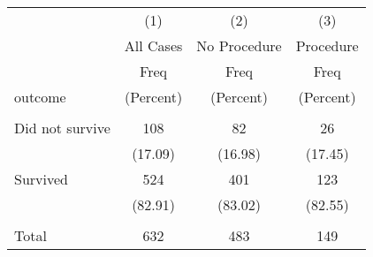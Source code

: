\begin{tabular}{lccc} \hline
 & (1) & (2) & (3) \\
 & All Cases & No Procedure & Procedure \\
 & Freq & Freq & Freq \\
outcome & (Percent) & (Percent) & (Percent) \\ \hline
 &  &  &  \\
Did not survive & 108 & 82 & 26 \\
 & (17.09) & (16.98) & (17.45) \\
Survived & 524 & 401 & 123 \\
 & (82.91) & (83.02) & (82.55) \\
 &  &  &  \\
 Total & 632 & 483 & 149 \\ \hline
\end{tabular}
